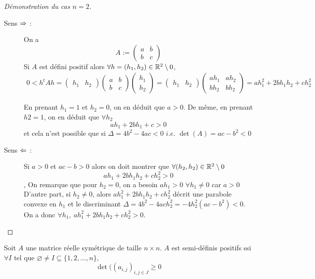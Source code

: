 \begin{proof}[Démonstration du cas $n=2$]
    \begin{description}
        \item[Sens $\Rightarrow$ :] 
    On a $$A:=\begin{pmatrix}
        a & b\\
        b & c
    \end{pmatrix}$$
    Si $A$ est défini positif alors $\forall h = (h_1,h_2) \in \mathbb{R}^2\setminus{0}$,
    \begin{align*}
        0<h^tAh = \begin{pmatrix}
            h_1 & h_2
        \end{pmatrix}
        \begin{pmatrix}
            a & b\\
            b & c
        \end{pmatrix} 
        \begin{pmatrix}
            h_1\\
            h_2
        \end{pmatrix}= \begin{pmatrix}
        h_1 & h_2
        \end{pmatrix} \begin{pmatrix}
            ah_1 & ah_2 \\
            bh_2 & bh_2
        \end{pmatrix} = ah_1^2 + 2bh_1h_2 + ch_2^2   \end{align*}


En prenant $h_1 = 1$ et $h_2 = 0$, on en déduit que $a > 0$.
De même, en prenant $h2 = 1$, on en déduit que $\forall h_2$
$$ah_1 + 2bh_1 + c > 0$$
et cela n'est possible que si $\Delta = 4b^2-4ac <0 \textit{ i.e. }\det(A) = ac-b^2<0$
    \item[Sens $\Leftarrow$ :] Si $a >0$ et $ac - b > 0$ alors on doit montrer que $\forall (h_2, h_2) \in \mathbb{R}^2\setminus{0}$ 
    $$ ah_1 + 2bh_1h_2 + ch_2^2 > 0$$,
    On remarque que pour $h_2 = 0$, on a besoin $ah_1 > 0$ $\forall h_1 \ne 0$ car $a > 0$
    D'autre part, si $h_2 \ne 0$, alors $ah_1^2+2bh_1h_2 + ch_2^2$ décrit une parabole convexe en $h_1$ et le discriminant $\Delta = 4b^2-4ach_2^2 = -4h_2^2(ac-b^2)<0$. On a donc $\forall h_1,\ ah_1^2+2bh_1h_2 + ch_2^2>0 $.
\end{description}
\end{proof}
\begin{proposition}
Soit $A$ une matrice réelle symétrique de taille $n \times n$.
  $A$ est semi-définis positifs ssi $\forall I$ tel que $\varnothing\ne I \subseteq \{1,2,...,n\}$,
    $$\det((a_{i,j})_{i,j\in J}\ge 0$$
\end{proposition}

